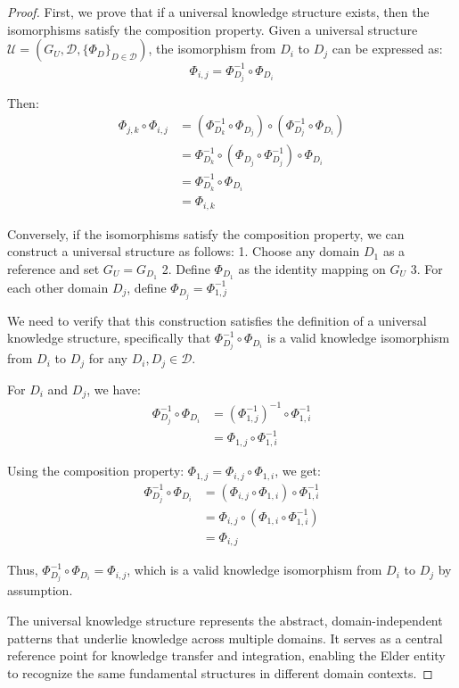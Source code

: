 \begin{proof}
First, we prove that if a universal knowledge structure exists, then the isomorphisms satisfy the composition property. Given a universal structure $\mathcal{U} = (G_U, \mathcal{D}, \{\Phi_D\}_{D \in \mathcal{D}})$, the isomorphism from $D_i$ to $D_j$ can be expressed as:
\begin{equation}
\Phi_{i,j} = \Phi_{D_j}^{-1} \circ \Phi_{D_i}
\end{equation}

Then:
\begin{align}
\Phi_{j,k} \circ \Phi_{i,j} &= (\Phi_{D_k}^{-1} \circ \Phi_{D_j}) \circ (\Phi_{D_j}^{-1} \circ \Phi_{D_i}) \\
&= \Phi_{D_k}^{-1} \circ (\Phi_{D_j} \circ \Phi_{D_j}^{-1}) \circ \Phi_{D_i} \\
&= \Phi_{D_k}^{-1} \circ \Phi_{D_i} \\
&= \Phi_{i,k}
\end{align}

Conversely, if the isomorphisms satisfy the composition property, we can construct a universal structure as follows:
1. Choose any domain $D_1$ as a reference and set $G_U = G_{D_1}$
2. Define $\Phi_{D_1}$ as the identity mapping on $G_U$
3. For each other domain $D_j$, define $\Phi_{D_j} = \Phi_{1,j}^{-1}$

We need to verify that this construction satisfies the definition of a universal knowledge structure, specifically that $\Phi_{D_j}^{-1} \circ \Phi_{D_i}$ is a valid knowledge isomorphism from $D_i$ to $D_j$ for any $D_i, D_j \in \mathcal{D}$.

For $D_i$ and $D_j$, we have:
\begin{align}
\Phi_{D_j}^{-1} \circ \Phi_{D_i} &= (\Phi_{1,j}^{-1})^{-1} \circ \Phi_{1,i}^{-1} \\
&= \Phi_{1,j} \circ \Phi_{1,i}^{-1}
\end{align}

Using the composition property: $\Phi_{1,j} = \Phi_{i,j} \circ \Phi_{1,i}$, we get:
\begin{align}
\Phi_{D_j}^{-1} \circ \Phi_{D_i} &= (\Phi_{i,j} \circ \Phi_{1,i}) \circ \Phi_{1,i}^{-1} \\
&= \Phi_{i,j} \circ (\Phi_{1,i} \circ \Phi_{1,i}^{-1}) \\
&= \Phi_{i,j}
\end{align}

Thus, $\Phi_{D_j}^{-1} \circ \Phi_{D_i} = \Phi_{i,j}$, which is a valid knowledge isomorphism from $D_i$ to $D_j$ by assumption.

The universal knowledge structure represents the abstract, domain-independent patterns that underlie knowledge across multiple domains. It serves as a central reference point for knowledge transfer and integration, enabling the Elder entity to recognize the same fundamental structures in different domain contexts.
\end{proof}

